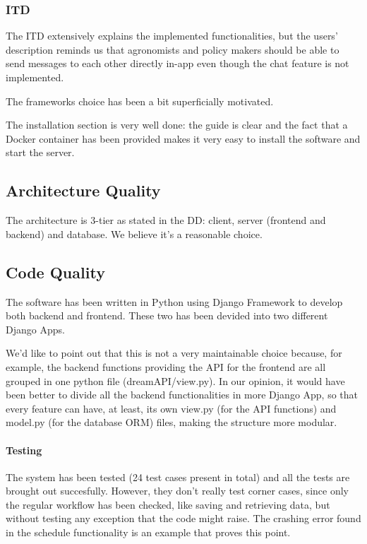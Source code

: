 \documentclass[table, 12pt]{article}
\begin{document}
\subsubsection{ITD}
The ITD extensively explains the implemented functionalities, but the users' description reminds us that agronomists and policy makers should be able to send messages to each other directly in-app even though the chat feature is not implemented.

The frameworks choice has been a bit superficially motivated.

The installation section is very well done: the guide is clear and the fact that a Docker container has been provided makes it very easy to install the software and start the server.

\subsection{Architecture Quality}
The architecture is 3-tier as stated in the DD: client, server (frontend and backend) and database. We believe it's a reasonable choice.

\subsection{Code Quality}
The software has been written in Python using Django Framework to develop both backend and frontend. These two has been devided into two different Django Apps. 

We'd like to point out that this is not a very maintainable choice because, for example, the backend functions providing the API for the frontend are all grouped in one python file (dreamAPI/view.py). In our opinion, it would have been better to divide all the backend functionalities in more Django App, so that every feature can have, at least, its own view.py (for the API functions) and model.py (for the database ORM) files, making the structure more modular.

\paragraph{Testing}
The system has been tested (24 test cases present in total) and all the tests are brought out succesfully. However, they don't really test corner cases, since only the regular workflow has been checked, like saving and retrieving data, but without testing any exception that the code might raise. The crashing error found in the schedule functionality is an example that proves this point.
\end{document}
